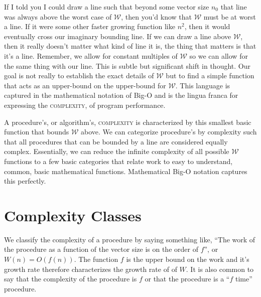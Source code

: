 \documentclass[]{tufte-handout}
\begin{document}
If I told you I could draw a line such that beyond some vector size $n_0$ that line was always above the worst case of $\mathcal{W}$, then you'd know that $\mathcal{W}$ must be at worst a line. If it were some other faster growing function like $n^2$, then it would eventually cross our imaginary bounding line. If we can draw a line above $\mathcal{W}$, then it really doesn't matter what kind of line it is, the thing that matters is that it's a line. Remember, we allow for constant multiples of $\mathcal{W}$ so we can allow for the same thing with our line.  This is subtle but significant shift in thought. Our goal is not really to establish the exact details of $\mathcal{W}$ but to find a simple function that acts as an upper-bound on the upper-bound for $\mathcal{W}$.  This language is captured in the mathematical notation of Big-O and is the lingua franca for expressing the \textsc{complexity}, of program performance.  

A procedure's, or algorithm's, \textsc{complexity} is characterized by this smallest basic function that bounds $\mathcal{W}$ above. We can categorize procedure's by complexity such that all procedures that can be bounded by a line are considered equally complex. Essentially, we can reduce the infinite complexity of all possible $\mathcal{W}$ functions to a few basic categories that relate work to easy to understand, common, basic mathematical functions. Mathematical Big-O notation captures this perfectly.

\section{Complexity Classes}

We classify the complexity of a procedure by saying something like, ``The work of the procedure as a function of the vector size is on the order of $f$'', or $W(n) = O(f(n))$. The function $f$ is the upper bound on the work and it's growth rate therefore characterizes the growth rate of of $W$. It is also common to say that the complexity of the procedure is $f$ or that the procedure is a ``$f$ time'' procedure.
\end{document}
